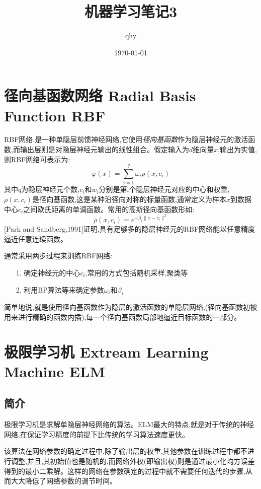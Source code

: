 \documentclass[UTF8,a4paper]{ctexart}%
\author{qhy}%
\title{机器学习笔记3}%
\date{\today}%
\begin{document}
  \maketitle
  \tableofcontents
  \newpage
  \section{径向基函数网络 Radial Basis Function RBF\color{red}{(样本中心$c_i$这个还需要看一看)}}
    RBF网络,是一种单隐层前馈神经网络,它使用\emph{径向基函数}作为隐层神经元的激活函数,而输出层则是对隐层神经元输出的线性组合。假定输入为$d$维向量$x$,输出为实值,则RBF网络可表示为:
    \begin{equation}
      \varphi(x) = \sum_{i = 1}^q \omega_i \rho(x,c_i)
    \end{equation}
    其中$q$为隐层神经元个数,$c_i$和$w_i$分别是第i个隐层神经元对应的中心和权重,$\rho(x,c_i)$是径向基函数,这是某种沿径向对称的标量函数,通常定义为样本$x$到数据中心$c_i$之间欧氏距离的单调函数。常用的高斯径向基函数形如:
    \begin{equation}
      \rho(x,c_i) = e^{-\beta_i\|x-c_i\|^2}
    \end{equation}
    [Park and Sandberg,1991]证明,具有足够多的隐层神经元的RBF网络能以任意精度逼近任意连续函数。

    通常采用两步过程来训练RBF网络:
    \begin{itemize}
      \item [1.] 确定神经元的中心$c_i$,常用的方式包括随机采样,聚类等
      \item [2.] 利用BP算法等来确定参数$\omega_i$和$\beta_i$
    \end{itemize}

    {\color{blue}
    简单地说,就是使用径向基函数作为隐层的激活函数的单隐层网络,(径向基函数初被用来进行精确的函数内插),每一个径向基函数局部地逼近目标函数的一部分。
    }

  \section{极限学习机 Extream Learning Machine ELM}

      \subsection{简介}

          极限学习机是求解单隐层神经网络的算法。ELM最大的特点,就是对于传统的神经网络,在保证学习精度的前提下比传统的学习算法速度更快。

          该算法在网络参数的确定过程中,除了输出层的权重,其他参数在训练过程中都不进行调整,并且,其初始值也是随机的,而网络外权(即输出权)则是通过最小化均方误差得到的最小二乘解。这样的网络在参数确定的过程中就不需要任何迭代的步骤,从而大大降低了网络参数的调节时间。
\end{document}
